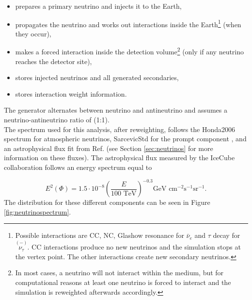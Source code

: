 \newcommand\barparen[1]{\overset{(-)}{#1}}
\vspace{2mm}
\begin{itemize}
\item prepares a primary neutrino and injects it to the Earth,
\item propagates the neutrino and works out interactions inside the Earth\footnote{Possible interactions are CC, NC, Glashow resonance for $\bar{\nu}_e$ and $\tau$ decay for $\barparen{\nu_\tau}$. CC interactions produce no new neutrinos and the simulation stops at the vertex point. The other interactions create new secondary neutrinos.} (when they occur),
\item makes a forced interaction inside the detection volume\footnote{
In most cases, a neutrino will not interact within the medium, but for computational reasons at least one neutrino is forced to interact and the simulation is reweighted afterwards accordingly.} (only if any neutrino reaches the detector site),
\item stores injected neutrinos and all generated secondaries,
\item stores interaction weight information.
\end{itemize}
\vspace{3mm}
\noindent The generator alternates between neutrino and antineutrino and assumes a neutrino-antineutrino ratio of (1:1).\\

\noindent The spectrum used for this analysis, after reweighting, follows the Honda2006 spectrum \cite{Honda:2006qj} for atmospheric neutrinos, SarcevicStd for the prompt component \cite{Enberg:2008te}, and an astrophysical flux fit from Ref. \cite{Aartsen:2014gkd} (see Section \ref{sec:neutrinos} for more information on these fluxes). The astrophysical flux measured by the IceCube collaboration follows an energy spectrum equal to

\begin{equation}
E^2 \left(\Phi \right) = 1.5 \cdot 10^{-8} \left( \frac{E}{100 \textrm{ TeV}} \right)^{-0.3} \textrm{GeV } \textrm{cm}^{-2} \textrm{s}^{-1} \textrm{sr}^{-1}.
\end{equation}
\vspace{3mm}
\noindent The distribution for these different components can be seen in Figure \ref{fig:neutrinospectrum}.

